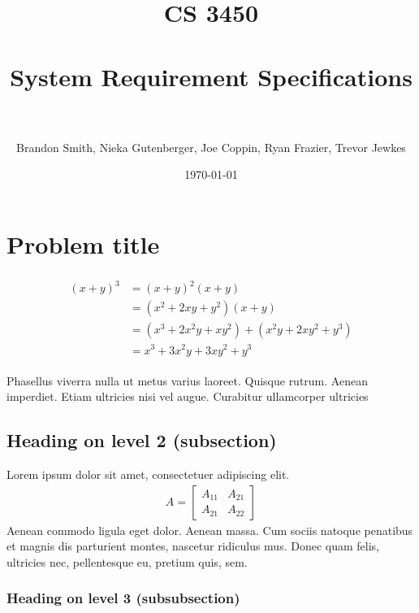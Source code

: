 \documentclass[paper=a4, fontsize=11pt]{scrartcl} %
\title{	
	\normalfont \normalsize 
	\textsc{CS 3450} \\ [25pt] %
	\horrule{0.5pt} \\[0.4cm] %
	\huge System Requirement Specifications \\ %
	\horrule{2pt} \\[0.5cm] %
}
\author{Brandon Smith, Nieka Gutenberger, Joe Coppin, Ryan Frazier, Trevor Jewkes} %
\date{\normalsize\today} %
\numberwithin{equation}{section} %
\numberwithin{figure}{section} %
\numberwithin{table}{section} %
\begin{document}
	
	\maketitle %
	
	
	\section{Problem title}
	
	\lipsum[2] %
	
	\begin{align} 
	\begin{split}
	(x+y)^3 	&= (x+y)^2(x+y)\\
	&=(x^2+2xy+y^2)(x+y)\\
	&=(x^3+2x^2y+xy^2) + (x^2y+2xy^2+y^3)\\
	&=x^3+3x^2y+3xy^2+y^3
	\end{split}					
	\end{align}
	
	Phasellus viverra nulla ut metus varius laoreet. Quisque rutrum. Aenean imperdiet. Etiam ultricies nisi vel augue. Curabitur ullamcorper ultricies
	
	
	\subsection{Heading on level 2 (subsection)}
	
	Lorem ipsum dolor sit amet, consectetuer adipiscing elit. 
	\begin{align}
	A = 
	\begin{bmatrix}
	A_{11} & A_{21} \\
	A_{21} & A_{22}
	\end{bmatrix}
	\end{align}
	Aenean commodo ligula eget dolor. Aenean massa. Cum sociis natoque penatibus et magnis dis parturient montes, nascetur ridiculus mus. Donec quam felis, ultricies nec, pellentesque eu, pretium quis, sem.
	
	
	\subsubsection{Heading on level 3 (subsubsection)}
	
\end{document}

